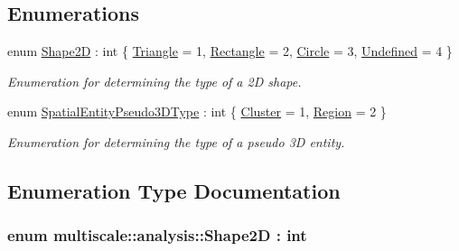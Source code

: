 \subsection*{Enumerations}
\begin{DoxyCompactItemize}
\item 
enum \hyperlink{namespacemultiscale_1_1analysis_ad895735ef4c40ec7f58424c33cba1b88}{Shape2\-D} \-: int \{ \hyperlink{namespacemultiscale_1_1analysis_ad895735ef4c40ec7f58424c33cba1b88a5e5500cb2b82eb72d550de644bd1b64b}{Triangle} = 1, 
\hyperlink{namespacemultiscale_1_1analysis_ad895735ef4c40ec7f58424c33cba1b88ace9291906a4c3b042650b70d7f3b152e}{Rectangle} = 2, 
\hyperlink{namespacemultiscale_1_1analysis_ad895735ef4c40ec7f58424c33cba1b88a30954d90085f6eaaf5817917fc5fecb3}{Circle} = 3, 
\hyperlink{namespacemultiscale_1_1analysis_ad895735ef4c40ec7f58424c33cba1b88aec0fc0100c4fc1ce4eea230c3dc10360}{Undefined} = 4
 \}
\begin{DoxyCompactList}\small\item\em Enumeration for determining the type of a 2\-D shape. \end{DoxyCompactList}\item 
enum \hyperlink{namespacemultiscale_1_1analysis_a6db9cbf10615e77e300c3e4cb1c56660}{Spatial\-Entity\-Pseudo3\-D\-Type} \-: int \{ \hyperlink{namespacemultiscale_1_1analysis_a6db9cbf10615e77e300c3e4cb1c56660a249694a485fc5d3289c38986b4f8e887}{Cluster} = 1, 
\hyperlink{namespacemultiscale_1_1analysis_a6db9cbf10615e77e300c3e4cb1c56660af447ac856e7e72435904956e3b15f433}{Region} = 2
 \}
\begin{DoxyCompactList}\small\item\em Enumeration for determining the type of a pseudo 3\-D entity. \end{DoxyCompactList}\end{DoxyCompactItemize}


\subsection{Enumeration Type Documentation}
\hypertarget{namespacemultiscale_1_1analysis_ad895735ef4c40ec7f58424c33cba1b88}{
\subsubsection[{Shape2\-D}]{\setlength{\rightskip}{0pt plus 5cm}enum {\bf multiscale\-::analysis\-::\-Shape2\-D} \-: int}}\label{namespacemultiscale_1_1analysis_ad895735ef4c40ec7f58424c33cba1b88}


